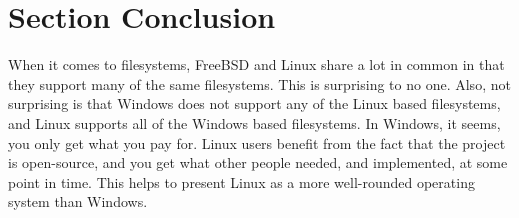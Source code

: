 \documentclass[letterpaper,10pt,draftclsnofoot,onecolumn]{IEEEtran}
\begin{document}
\section{Section Conclusion}
\noindent When it comes to filesystems, FreeBSD and Linux share a lot in common in that they support many of the same filesystems. This is surprising to no one. Also, not surprising is that Windows does not support any of the Linux based filesystems, and Linux supports all of the Windows based filesystems. In Windows, it seems, you only get what you pay for. Linux users benefit from the fact that the project is open-source, and you get what other people needed, and implemented, at some point in time. This helps to present Linux as a more well-rounded operating system than Windows.

\newpage


\end{document}
